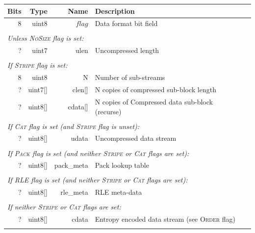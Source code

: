 \documentclass[a4paper]{article}
\begin{document}
\begin{table}[h]
\centering
\begin{tabular}{|r|r|r|r|p{9cm}|l|}
\hline
\multicolumn{2}{|r|}{\textbf{Bits} } & \textbf{Type}  & \textbf{Name} & \multicolumn{2}{p{9cm}|}{\textbf{Description}} \\
\hline
\multicolumn{2}{|r|}{8} & uint8 & $flag$ & \multicolumn{2}{p{9cm}|}{Data format bit field}\\
\cline{1-6}

\multicolumn{6}{|l|}{}\\[-0.3em]
\multicolumn{6}{|l|}{\textit{Unless \textsc{NoSize} flag is set:} } \\
\cline{2-5}
& ? & uint7 & ulen & Uncompressed length & \\
\cline{2-5}

\multicolumn{6}{|l|}{}\\[-0.3em]
\multicolumn{6}{|l|}{\textit{If \textsc{Stripe} flag is set:} } \\
\cline{2-5}
& 8 & uint8 & N & Number of sub-streams & \\
& ? & uint7[] & clen[] & N copies of compressed sub-block length & \\
& ? & uint8[] & cdata[] & N copies of Compressed data sub-block (recurse) & \\
\cline{2-5}

\multicolumn{6}{|l|}{}\\[-0.7em]
\multicolumn{6}{|l|}{\textit{If \textsc{Cat} flag is set (and \textsc{Stripe} flag is unset):} } \\
\cline{2-5}
& ? & uint8[] & udata & Uncompressed data stream & \\
\cline{2-5}

\multicolumn{6}{|l|}{}\\[-0.7em]
\multicolumn{6}{|l|}{\textit{If \textsc{Pack} flag is set (and neither \textsc{Stripe} or \textsc{Cat} flags are set):} } \\
\cline{2-5}
& ? & uint8[] & pack\_meta & Pack lookup table & \\
\cline{2-5}

\multicolumn{6}{|l|}{}\\[-0.7em]
\multicolumn{6}{|l|}{\textit{If \textsc{RLE} flag is set (and neither \textsc{Stripe} or \textsc{Cat} flags are set):} } \\
\cline{2-5}
& ? & uint8[] & rle\_meta & RLE meta-data\\
\cline{2-5}

\multicolumn{6}{|l|}{}\\[-0.7em]
\multicolumn{6}{|l|}{\textit{If neither \textsc{Stripe} or \textsc{Cat} flags are set:} } \\
\cline{2-5}
& ? & uint8[] & cdata & Entropy encoded data stream (see \textsc{Order} flag) & \\
\cline{2-5}
\multicolumn{6}{|l|}{}\\
\hline
\end{tabular}
\end{table}
\end{document}
